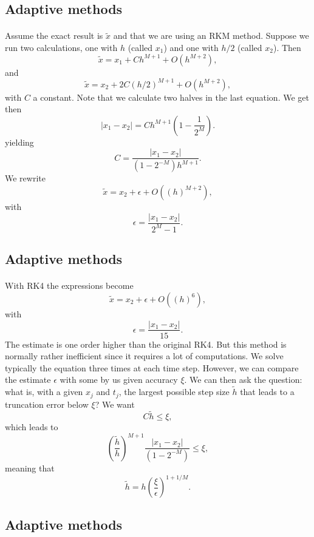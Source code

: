 \documentclass[%
oneside,                 %
final,                   %
10pt]{article}
\begin{document}
\subsection{Adaptive methods}

\paragraph{}
Assume the exact result is $\tilde{x}$ and that we are using an RKM method. Suppose we run two calculations, one with $h$ (called $x_1$) and one with $h/2$ (called $x_2$). Then
\[
\tilde{x}=x_1+Ch^{M+1}+O(h^{M+2}),
\] 
and
\[
\tilde{x}=x_2+2C(h/2)^{M+1}+O(h^{M+2}),
\] 
with $C$ a constant. Note that we calculate two halves in the last equation. We get then
\[
|x_1-x_2| = Ch^{M+1}(1-\frac{1}{2^M}).
\]
yielding
\[
C=\frac{|x_1-x_2|}{(1-2^{-M})h^{M+1}}.
\]
We rewrite
\[
\tilde{x}=x_2+\epsilon+O((h)^{M+2}),
\] 
with 
\[
\epsilon = \frac{|x_1-x_2|}{2^M-1}.
\]



\subsection{Adaptive methods}

\paragraph{}
With RK4 the expressions become
\[
\tilde{x}=x_2+\epsilon+O((h)^{6}),
\] 
with
\[
\epsilon = \frac{|x_1-x_2|}{15}.
\]
The estimate is one order higher than the original RK4. But this method is normally rather inefficient since it requires a lot of computations. We solve typically the equation three times at each time step. 
However, we can compare the estimate $\epsilon$ with some by us given accuracy $\xi$. 
We can then ask the question: what is, with a given $x_j$ and $t_j$, the largest possible step size $\tilde{h}$ that leads to a truncation error below $\xi$?
We want
\[
C\tilde{h} \le \xi,
\]
which leads to 
\[
\left(\frac{\tilde{h}}{h}\right)^{M+1}\frac{|x_1-x_2|}{(1-2^{-M})}\le \xi, 
\]
meaning that
\[
\tilde{h}=h\left(\frac{\xi}{\epsilon}\right)^{1+1/M}. 
\]




\subsection{Adaptive methods}
\end{document}
